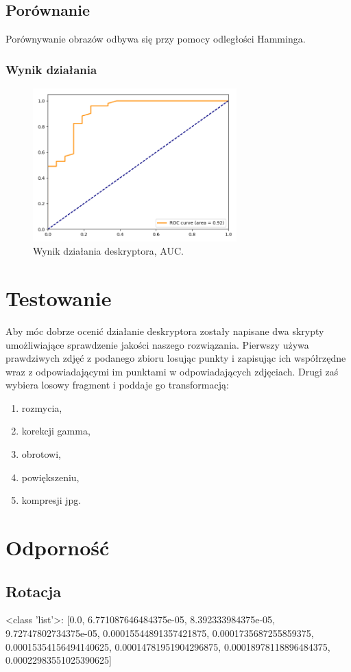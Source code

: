 \documentclass[a4paper,11pt]{article}
\begin{document}
\subsection{Porównanie}
Porównywanie obrazów odbywa się przy pomocy odległości Hamminga.


\subsubsection{Wynik działania}

\begin{figure}[H]
\begin{center}
\includegraphics[width=0.7\textwidth]{./img/brief.png}
\end{center}
\caption{Wynik działania deskryptora, AUC.}
\end{figure}

\section{Testowanie}
Aby móc dobrze ocenić działanie deskryptora zostały napisane dwa skrypty umożliwiające sprawdzenie jakości naszego rozwiązania. Pierwszy używa prawdziwych zdjęć z podanego zbioru losując punkty i zapisując ich współrzędne wraz z odpowiadającymi im punktami w odpowiadających zdjęciach. Drugi zaś wybiera losowy fragment i poddaje go transformacją:
\begin{enumerate}
\item rozmycia,
\item korekcji gamma,
\item obrotowi,
\item powiększeniu,
\item kompresji jpg.
\end{enumerate}
\section{Odporność}
\subsection{Rotacja}
<class 'list'>: [0.0, 6.771087646484375e-05, 8.392333984375e-05, 9.72747802734375e-05, 0.00015544891357421875, 0.0001735687255859375, 0.00015354156494140625, 0.00014781951904296875, 0.00018978118896484375, 0.00022983551025390625]
\end{document}
